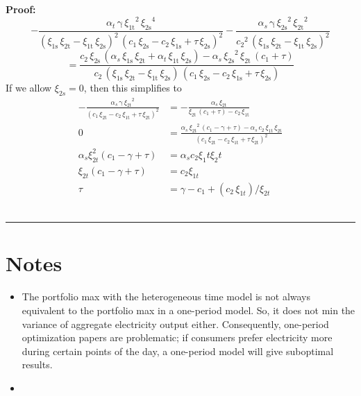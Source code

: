 \documentclass[12pt,a4paper]{extarticle}
\newenvironment{proof}[1][Proof]{\noindent\textbf{#1:} }{\ \rule{0.5em}{0.5em}}
\begin{document}
\begin{proof}
$$-\frac{\alpha _{t}\,\mathrm{\gamma}\,{\xi _{\mathrm{1t}}}^2\,{\xi _{\mathrm{2s}}}^4}{{\left(\xi _{\mathrm{1s}}\,\xi _{\mathrm{2t}}-\xi _{\mathrm{1t}}\,\xi _{\mathrm{2s}}\right)}^2\,{\left(c_{1}\,\xi _{\mathrm{2s}}-c_{2}\,\xi _{\mathrm{1s}}+\tau \,\xi _{\mathrm{2s}}\right)}^2}-\frac{\alpha _{s}\,\mathrm{\gamma}\,{\xi _{\mathrm{2s}}}^2\,{\xi _{\mathrm{2t}}}^2}{{c_{2}}^2\,{\left(\xi _{\mathrm{1s}}\,\xi _{\mathrm{2t}}-\xi _{\mathrm{1t}}\,\xi _{\mathrm{2s}}\right)}^2} $$
$$ = 	
\frac{c_{2}\,\xi _{\mathrm{2s}}\,\left(\alpha _{s}\,\xi _{\mathrm{1s}}\,\xi _{\mathrm{2t}}+\alpha _{t}\,\xi _{\mathrm{1t}}\,\xi _{\mathrm{2s}}\right)-\alpha _{s}\,{\xi _{\mathrm{2s}}}^2\,\xi _{\mathrm{2t}}\,\left(c_{1}+\tau \right)}{c_{2}\,\left(\xi _{\mathrm{1s}}\,\xi _{\mathrm{2t}}-\xi _{\mathrm{1t}}\,\xi _{\mathrm{2s}}\right)\,\left(c_{1}\,\xi _{\mathrm{2s}}-c_{2}\,\xi _{\mathrm{1s}}+\tau \,\xi _{\mathrm{2s}}\right)}
$$
If we allow $\xi_{2s} = 0$, then this simplifies to
\begin{align*}
-\frac{\alpha _{s}\,\mathrm{\gamma}\,{\xi _{\mathrm{2t}}}^2}{{\left(c_{1}\,\xi _{\mathrm{2t}}-c_{2}\,\xi _{\mathrm{1t}}+\tau \,\xi _{\mathrm{2t}}\right)}^2} &= -\frac{\alpha _{s}\,\xi _{\mathrm{2t}}}{\xi _{\mathrm{2t}}\,\left(c_{1}+\tau \right)-c_{2}\,\xi _{\mathrm{1t}}}\\
0 &= \frac{\alpha _{s}\,{\xi _{\mathrm{2t}}}^2\,\left(c_{1}-\mathrm{\gamma}+\tau \right)-\alpha _{s}\,c_{2}\,\xi _{\mathrm{1t}}\,\xi _{\mathrm{2t}}}{{\left(c_{1}\,\xi _{\mathrm{2t}}-c_{2}\,\xi _{\mathrm{1t}}+\tau \,\xi _{\mathrm{2t}}\right)}^2} \\
\alpha_s \xi_{2t}^2 (c_1 - \gamma + \tau) &= \alpha_s c_2 \xi_1t \xi_2t
 \\
\xi_{2t} (c_1 - \gamma + \tau) &=  c_2 \xi_{1t}\\
\tau &= 
\gamma - c_1 + (c_2\,\xi_{1t})/\xi_{2t}
\end{align*}
\end{proof}

\pagebreak



\pagebreak

\section{Notes}

\begin{itemize}
	\item The portfolio max with the heterogeneous time model is not always equivalent to the portfolio max in a one-period model. So, it does not min the variance of aggregate electricity output either.  Consequently, one-period optimization papers are problematic; if consumers prefer electricity more during certain points of the day, a one-period model will give suboptimal results.
	\item 
\end{itemize}
\end{document}
